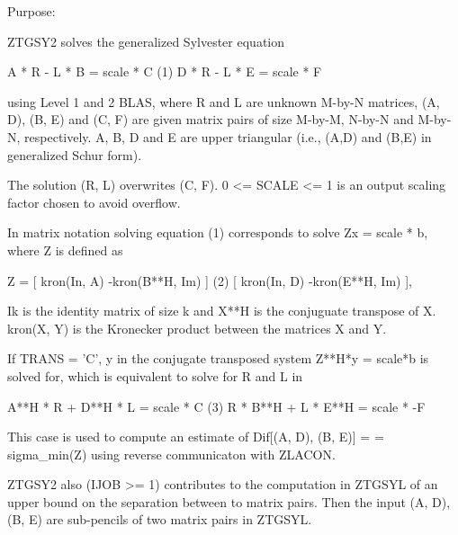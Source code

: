  \begin{DoxyParagraph}{Purpose\+: }
\begin{DoxyVerb} ZTGSY2 solves the generalized Sylvester equation

             A * R - L * B = scale * C               (1)
             D * R - L * E = scale * F

 using Level 1 and 2 BLAS, where R and L are unknown M-by-N matrices,
 (A, D), (B, E) and (C, F) are given matrix pairs of size M-by-M,
 N-by-N and M-by-N, respectively. A, B, D and E are upper triangular
 (i.e., (A,D) and (B,E) in generalized Schur form).

 The solution (R, L) overwrites (C, F). 0 <= SCALE <= 1 is an output
 scaling factor chosen to avoid overflow.

 In matrix notation solving equation (1) corresponds to solve
 Zx = scale * b, where Z is defined as

        Z = [ kron(In, A)  -kron(B**H, Im) ]             (2)
            [ kron(In, D)  -kron(E**H, Im) ],

 Ik is the identity matrix of size k and X**H is the conjuguate transpose of X.
 kron(X, Y) is the Kronecker product between the matrices X and Y.

 If TRANS = 'C', y in the conjugate transposed system Z**H*y = scale*b
 is solved for, which is equivalent to solve for R and L in

             A**H * R  + D**H * L   = scale * C           (3)
             R  * B**H + L  * E**H  = scale * -F

 This case is used to compute an estimate of Dif[(A, D), (B, E)] =
 = sigma_min(Z) using reverse communicaton with ZLACON.

 ZTGSY2 also (IJOB >= 1) contributes to the computation in ZTGSYL
 of an upper bound on the separation between to matrix pairs. Then
 the input (A, D), (B, E) are sub-pencils of two matrix pairs in
 ZTGSYL.\end{DoxyVerb}
 
\end{DoxyParagraph}

